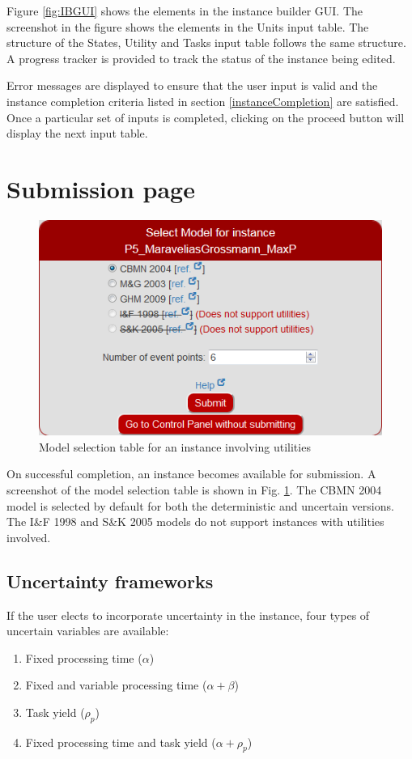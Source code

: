 Figure \ref{fig:IBGUI} shows the elements in the instance builder GUI. The screenshot in the figure shows the elements in the Units input table. The structure of the States, Utility and Tasks input table follows the same structure. A progress tracker is provided to track the status of the instance being edited. 

Error messages are displayed to ensure that the user input is valid and the instance completion criteria listed in section \ref{instanceCompletion} are satisfied.
 Once a particular set of inputs is completed, clicking on the proceed button will display the next input table.






\section{Submission page}

\begin{figure}[htb]
\centering
\includegraphics[width=0.8\linewidth]{Images/SelectModelUtilities.png}
\caption{Model selection table for an instance involving utilities}
\label{fig:selectModel}
\end{figure}

On successful completion, an instance becomes available for submission. A screenshot of the model selection table is shown in Fig. \ref{fig:selectModel}. The CBMN 2004 model is selected by default for both the deterministic and uncertain versions. The I\&F 1998 and S\&K 2005 models do not support instances with utilities involved.

\subsection{Uncertainty frameworks}

If the user elects to incorporate uncertainty in the instance, four types of uncertain variables are available:
\begin{enumerate}
\item Fixed processing time ($\alpha$)
\item Fixed and variable processing time ($\alpha + \beta$)
\item Task yield ($\rho_p$)
\item Fixed processing time and task yield ($\alpha + \rho_p$)
\end{enumerate}

